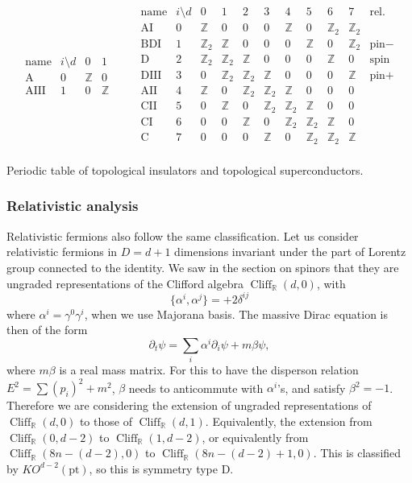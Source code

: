 \documentclass[12pt]{article}
\numberwithin{equation}{section}
\numberwithin{figure}{section}
\theoremstyle{remark}
\renewenvironment{table}[1][]{
  \begin{originaltable}[#1]
    \begin{mdframed}[linecolor=black!0,backgroundcolor=black!1]
}{
    \end{mdframed}
  \end{originaltable}
}
\def\bR{\mathbb{R}}
\def\bZ{\mathbb{Z}}
\def\pt{\mathrm{pt}}
\def\Cliff{\mathop{\mathrm{Cliff}}\nolimits}
\begin{document}
\begin{table}
\[
\begin{array}{c|c|cc}
  \text{name} & i \setminus d & 0 & 1 \\
  \hline
  \text{A} & 0 & \bZ & 0\\
  \text{AIII} & 1 & 0 & \bZ\\
\end{array}
\qquad
\begin{array}{c|c|cccccccc|c}
 \text{name} & i \setminus d & 0 & 1 & 2 & 3 & 4 & 5 & 6 & 7 &\text{rel.}\\
  \hline
  \text{AI} & 0 & \bZ & 0 & 0 & 0 & \bZ & 0 & \bZ_2 & \bZ_2& \\
  \text{BDI} & 1 & \bZ_2 & \bZ & 0 & 0 & 0 & \bZ & 0 & \bZ_2 & \text{pin$-$} \\
  \text{D} & 2 & \bZ_2 & \bZ_2 & \bZ & 0 & 0 & 0 & \bZ & 0 &\text{spin}\\
  \text{DIII} & 3 & 0 & \bZ_2 & \bZ_2 & \bZ & 0 & 0 & 0 & \bZ&\text{pin$+$}\\
  \text{AII} & 4 & \bZ & 0 & \bZ_2 & \bZ_2 & \bZ & 0 & 0 & 0&\\
  \text{CII} & 5 & 0 & \bZ & 0 & \bZ_2 & \bZ_2 & \bZ & 0 & 0&\\ 
  \text{CI} & 6 & 0 & 0 & \bZ & 0 & \bZ_2 & \bZ_2 & \bZ  & 0&\\
  \text{C} & 7 & 0 & 0 & 0 & \bZ & 0 & \bZ_2 & \bZ_2 & \bZ&\\
\end{array}
\]
\caption{Periodic table of topological insulators
and topological superconductors. \label{tab:periodic-table}}
\end{table}

\subsubsection{Relativistic analysis}

Relativistic fermions also follow the same classification.
Let us consider relativistic fermions in $D=d+1$ dimensions invariant under 
the part of Lorentz group connected to the identity. 
We saw in the section on spinors that they are ungraded representations of 
the Clifford algebra $\Cliff_\bR(d,0)$, with \begin{equation}
\{\alpha^i,\alpha^j\}=+2\delta^{ij}
\end{equation} where $\alpha^i=\gamma^0\gamma^i$,
when we use Majorana basis.
The massive Dirac equation  is then of the form  \begin{equation}
\partial_t \psi = \sum_i \alpha^i\partial_i \psi + m\beta \psi,
\label{Maj-fer}
\end{equation}
where $m\beta$ is a real mass matrix. 
For this to have the disperson relation $E^2= \sum (p_i)^2 + m^2$,
$\beta$ needs to anticommute with $\alpha^i$'s,
and satisfy $\beta^2=-1$.
Therefore we are considering the extension of ungraded representations of $\Cliff_\bR(d,0)$
to those of $\Cliff_\bR(d,1)$.
Equivalently, the extension from $\Cliff_\bR(0,d-2)$ to $\Cliff_\bR(1,d-2)$,
or equivalently from $\Cliff_\bR(8n-(d-2),0)$ to $\Cliff_\bR(8n-(d-2)+1,0)$.
This is classified by $KO^{d-2}(\pt)$, so this is symmetry type D.
\end{document}
